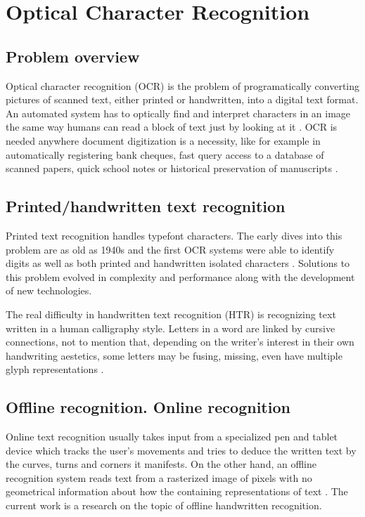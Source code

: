\chapter{Optical Character Recognition}
\label{chap:ch2}

\section{Problem overview}
\label{sec:ch3sec1}

Optical character recognition (OCR) is the problem of programatically converting pictures of scanned text, either printed or handwritten, into a digital text format. An automated system has to optically find and interpret characters in an image the same way humans can read a block of text just by looking at it \cite{ocr_desc}. OCR is needed anywhere document digitization is a necessity, like for example in automatically registering bank cheques, fast query access to a database of scanned papers, quick school notes or historical preservation of manuscripts \cite{ocr_desc}. 

\section{Printed/handwritten text recognition}
\label{sec:ch3sec1}

Printed text recognition handles typefont characters. The early dives into this problem are as old as 1940s and the first OCR systems were able to identify digits as well as both printed and handwritten isolated characters \cite{ocr_review}. Solutions to this problem evolved in complexity and performance along with the development of new technologies.

The real difficulty in handwritten text recognition (HTR) is recognizing text written in a human calligraphy style. Letters in a word are linked by cursive connections, not to mention that, depending on the writer's interest in their own handwriting aestetics, some letters may be fusing, missing, even have multiple glyph representations \cite{ocr_review}.


\section{Offline recognition. Online recognition}

Online text recognition usually takes input from a specialized pen and tablet device which tracks the user's movements and tries to deduce the written text by the curves, turns and corners it manifests.  On the other hand, an offline recognition system reads text from a rasterized image of pixels with no geometrical information about how the containing representations of text \cite{ocr_review}. The current work is a research on the topic of offline handwritten recognition.

